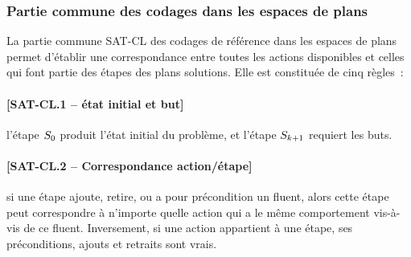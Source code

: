 \subsubsection{Partie commune des codages dans les espaces de plans}

La partie commune SAT-CL des codages de référence dans les espaces de plans permet d'établir une correspondance entre toutes les actions disponibles et
celles qui font partie des étapes des plans solutions. Elle est constituée
de cinq règles~:


\paragraph*{[SAT-CL.1 -- état initial et but]} l'étape $S_{0}$ produit l'état
  initial du problème, et l'étape $S_{k+1}$ requiert les buts.
\paragraph*{[SAT-CL.2 -- Correspondance action/étape]} si une étape ajoute, retire, ou a
  pour précondition un fluent, alors cette étape peut correspondre à n'importe
  quelle action qui a le même comportement vis-à-vis de ce fluent. Inversement,
  si une action appartient à une étape, ses préconditions, ajouts et retraits
  sont vrais.


